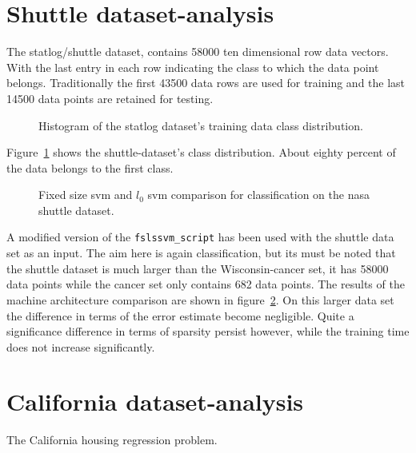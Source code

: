 \section{Shuttle dataset-analysis}
The statlog/shuttle dataset, contains 58000 ten dimensional row data vectors. With the last entry in each row indicating the class to which
the data point belongs. Traditionally the first 43500 data rows are used for training and the last 14500 data points are retained for testing.
\begin{figure}
\centering

\caption{Histogram of the statlog dataset's training data class distribution.}
\label{fig:histShuttle}
\end{figure}
Figure~\ref{fig:histShuttle} shows the shuttle-dataset's class distribution. About eighty percent of the data belongs to the first class. 
\begin{figure}
\centering



\caption{Fixed size svm and $l_0$ svm comparison for classification on the nasa shuttle dataset.}
\label{fig:shuttle}
\end{figure}
A modified version of the \texttt{fslssvm\_script} has been used with the shuttle data set as an input. The aim here is again classification, but its must be noted that the shuttle dataset is much larger than the Wisconsin-cancer set, it has 58000 data points while the cancer set only contains 682 data points. The results of the machine architecture comparison are shown in figure~\ref{fig:shuttle}. On this larger data set the difference in terms of the error estimate become negligible. Quite a significance difference in terms of sparsity persist however, while the training time does not increase significantly. 


\section{California dataset-analysis}
The California housing regression problem.

